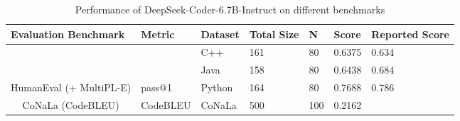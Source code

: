 

\begin{table}[H]
\centering
\caption{Performance of DeepSeek-Coder-6.7B-Instruct on different benchmarks}
\begin{tabular}{lllllll}
\hline
\multicolumn{1}{|l|}{Evaluation   Benchmark}                    & \multicolumn{1}{l|}{Metric}                                                & \multicolumn{1}{l|}{Dataset} & \multicolumn{1}{l|}{Total Size} & \multicolumn{1}{l|}{N} & \multicolumn{1}{l|}{Score}  & \multicolumn{1}{l|}{Reported Score} \\ \hline
\multicolumn{1}{|c|}{}                                          & \multicolumn{1}{l|}{{\color[HTML]{467886} }}                               & \multicolumn{1}{l|}{C++}     & \multicolumn{1}{l|}{161}        & \multicolumn{1}{l|}{80}              & \multicolumn{1}{l|}{0.6375} & \multicolumn{1}{l|}{0.634}          \\ \cline{3-7} 
\multicolumn{1}{|c|}{}                                          & \multicolumn{1}{l|}{{\color[HTML]{467886} }}                               & \multicolumn{1}{l|}{Java}    & \multicolumn{1}{l|}{158}        & \multicolumn{1}{l|}{80}              & \multicolumn{1}{l|}{0.6438} & \multicolumn{1}{l|}{0.684}          \\ \cline{3-7} 
\multicolumn{1}{|c|}{\multirow{-3}{*}{HumanEval (+ MultiPL-E)}} & \multicolumn{1}{l|}{\multirow{-3}{*}{{pass@1}}} & \multicolumn{1}{l|}{Python}  & \multicolumn{1}{l|}{164}        & \multicolumn{1}{l|}{80}              & \multicolumn{1}{l|}{0.7688} & \multicolumn{1}{l|}{0.786} \\ \hline
\multicolumn{1}{|c|}{CoNaLa   (CodeBLEU)}                       & \multicolumn{1}{l|}{CodeBLEU}                                              & \multicolumn{1}{l|}{CoNaLa}  & \multicolumn{1}{l|}{500}        & \multicolumn{1}{l|}{100}             & \multicolumn{1}{l|}{0.2162} & \multicolumn{1}{l|}{}               \\ \hline
\end{tabular}
\label{tab:CodeBenchmarkPreEval}
\end{table}


